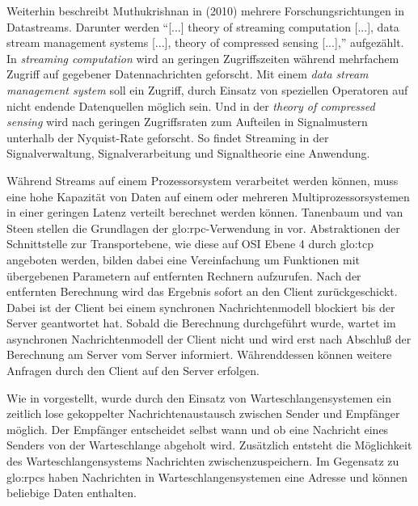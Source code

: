 Weiterhin beschreibt Muthukrishnan in  (2010) mehrere Forschungsrichtungen in Datastreams. Darunter werden "`[...] theory of streaming computation [...], data stream management systems [...], theory of compressed sensing [...],"'   aufgezählt. In \textit{streaming computation} wird an geringen Zugriffszeiten während mehrfachem Zugriff auf gegebener Datennachrichten geforscht. 
Mit einem \textit{data stream management system} soll ein Zugriff, durch Einsatz von speziellen Operatoren auf nicht endende Datenquellen möglich sein. Und in der \textit{theory of compressed sensing} wird nach geringen Zugriffsraten zum Aufteilen in Signalmustern unterhalb der Nyquist-Rate geforscht. So findet Streaming in der Signalverwaltung, Signalverarbeitung und Signaltheorie eine Anwendung.


Während Streams auf einem Prozessorsystem verarbeitet werden können, muss eine hohe Kapazität von Daten auf einem oder mehreren Multiprozessorsystemen in einer geringen Latenz verteilt berechnet werden können. Tanenbaum und van Steen stellen die Grundlagen der \gls{glo:rpc}-Verwendung in  vor. Abstraktionen der Schnittstelle zur Transportebene, wie diese auf OSI Ebene 4 durch \gls{glo:tcp} angeboten werden, bilden dabei eine Vereinfachung um Funktionen mit übergebenen Parametern auf entfernten Rechnern aufzurufen. Nach der entfernten Berechnung wird das Ergebnis sofort an den Client zurückgeschickt. Dabei ist der Client bei einem synchronen Nachrichtenmodell blockiert bis der Server geantwortet hat. Sobald die Berechnung durchgeführt wurde, wartet im asynchronen Nachrichtenmodell der Client nicht und wird erst nach Abschluß der Berechnung am Server vom Server informiert. Währenddessen können weitere Anfragen durch den Client auf den Server erfolgen. 

Wie in  vorgestellt, wurde durch den Einsatz von Warteschlangensystemen ein zeitlich lose gekoppelter Nachrichtenaustausch zwischen Sender und Empfänger möglich. Der Empfänger entscheidet selbst wann und ob eine Nachricht eines Senders von der Warteschlange abgeholt wird. Zusätzlich entsteht die Möglichkeit des Warteschlangensystems Nachrichten zwischenzuspeichern. Im Gegensatz zu \glspl{glo:rpc} haben Nachrichten in Warteschlangensystemen eine Adresse und können beliebige Daten enthalten. 

